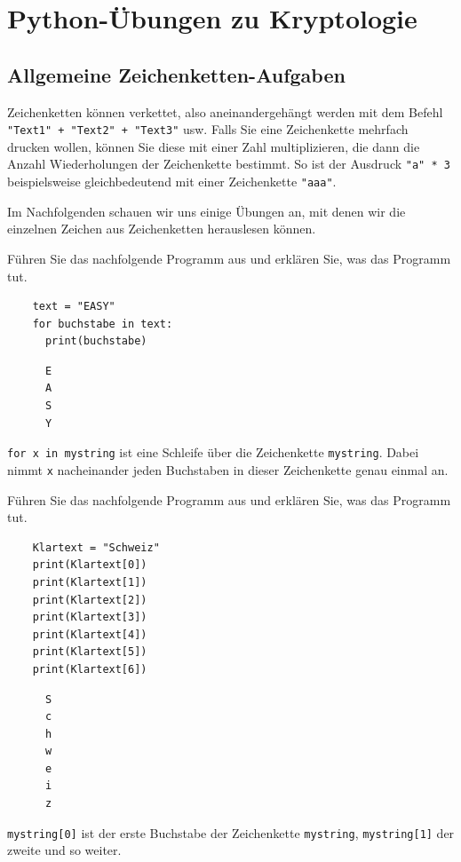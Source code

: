 \chapter{Python-Übungen zu Kryptologie}\label{ch:Kryptologie-Python}

\section{Allgemeine Zeichenketten-Aufgaben}
Zeichenketten können verkettet, also aneinandergehängt werden mit dem Befehl \lstinline|"Text1" + "Text2" + "Text3"| usw. Falls Sie eine Zeichenkette mehrfach drucken wollen, können Sie diese mit einer Zahl multiplizieren, die dann die Anzahl Wiederholungen der Zeichenkette bestimmt. So ist der Ausdruck \lstinline|"a" * 3| beispielsweise gleichbedeutend mit einer Zeichenkette \lstinline|"aaa"|.

Im Nachfolgenden schauen wir uns einige Übungen an, mit denen wir die einzelnen Zeichen aus Zeichenketten herauslesen können.

\begin{myexercise}
    Führen Sie das nachfolgende Programm aus und erklären Sie, was das Programm tut.
    \begin{lstlisting}
    text = "EASY"
    for buchstabe in text:
      print(buchstabe)
  \end{lstlisting}
    \begin{myanswer}
        \begin{lstlisting}
      E
      A
      S
      Y
    \end{lstlisting}
        \lstinline|for x in mystring| ist eine Schleife über die Zeichenkette \lstinline|mystring|. Dabei nimmt \lstinline|x| nacheinander jeden Buchstaben in dieser Zeichenkette genau einmal an.
    \end{myanswer}
\end{myexercise}

\begin{myexercise}\label{myexercise:index}
    Führen Sie das nachfolgende Programm aus und erklären Sie, was das Programm tut.
    \begin{lstlisting}
    Klartext = "Schweiz"
    print(Klartext[0])
    print(Klartext[1])
    print(Klartext[2])
    print(Klartext[3])
    print(Klartext[4])
    print(Klartext[5])
    print(Klartext[6])
  \end{lstlisting}
    \begin{myanswer}
        \begin{lstlisting}
      S
      c
      h
      w
      e
      i
      z
    \end{lstlisting}
        \lstinline|mystring[0]| ist der erste Buchstabe der Zeichenkette \lstinline|mystring|, \lstinline|mystring[1]| der zweite und so weiter.
    \end{myanswer}
\end{myexercise}

